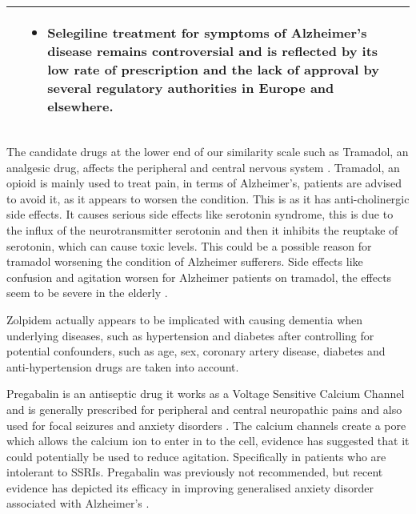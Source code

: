 \documentclass[preprint,12pt]{elsarticle}
\begin{document}
\begin{table}[h!]
\begin{tabular}{ | c | m{4.5cm} | m{4.5cm} | }
\begin{itemize}
      \end{itemize}
    & 
      \begin{itemize}
        \item Selegiline treatment for symptoms of Alzheimer's disease remains controversial and is reflected by its low rate of prescription and the lack of approval by several regulatory authorities in Europe and elsewhere. 
            \end{itemize}
    \\ \hline
  \end{tabular}
 \end{table}
\normalsize

The candidate drugs at the lower end of our similarity scale such as Tramadol, an analgesic drug, affects the peripheral and central nervous system \cite{Minami2015}. Tramadol, an opioid is mainly used to treat pain,  in terms of Alzheimer's, patients are advised to avoid it, as it appears to worsen the condition.  This is as it has anti-cholinergic side effects. It causes serious side effects like serotonin syndrome, this is due to the influx of the neurotransmitter serotonin and then it inhibits the reuptake of serotonin, which can cause toxic levels. This could be a possible reason for tramadol worsening the condition of Alzheimer sufferers. Side effects like confusion and agitation worsen for Alzheimer patients on tramadol, the effects seem to be severe in the elderly \cite{Vazzana2015}.

Zolpidem actually appears to be implicated with causing dementia when underlying diseases, such as hypertension and diabetes after controlling for potential confounders, such as age, sex, coronary artery disease, diabetes and anti-hypertension drugs are taken into account.

Pregabalin is an antiseptic drug it works as a Voltage Sensitive Calcium Channel and is generally prescribed for peripheral and central neuropathic pains and also used for focal seizures and anxiety disorders \cite{Taylor2007}. The calcium channels create a pore which allows the calcium ion to enter in to the cell, evidence has suggested that it could potentially be used to reduce agitation. Specifically in patients who are intolerant to SSRIs. Pregabalin was previously not recommended, but recent evidence has depicted its efficacy in improving generalised anxiety disorder associated with Alzheimer's \cite{Kasper2009}.	
\end{document}
